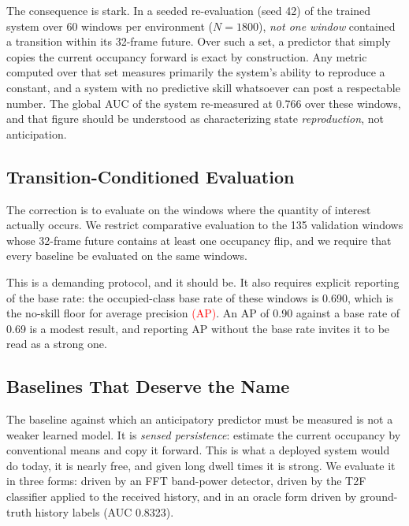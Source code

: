 \documentclass[lettersize,journal]{IEEEtran}
\newcommand{\red}[1]{\textcolor{red}{#1}}
\begin{document}
The consequence is stark. In a seeded re-evaluation (seed 42) of the
trained system over 60 windows per environment ($N = 1800$), \emph{not
one window} contained a transition within its 32-frame future. Over such
a set, a predictor that simply copies the current occupancy forward is
exact by construction. Any metric computed over that set measures
primarily the system's ability to reproduce a constant, and a system
with no predictive skill whatsoever can post a respectable number. The
global AUC of the system re-measured at 0.766 over these windows, and
that figure should be understood as characterizing state
\emph{reproduction}, not anticipation.

\subsection{\textbf{Transition-Conditioned Evaluation}}
The correction is to evaluate on the windows where the quantity of
interest actually occurs. We restrict comparative evaluation to the 135
validation windows whose 32-frame future contains at least one occupancy
flip, and we require that every baseline be evaluated on the same
windows.

This is a demanding protocol, and it should be. It also requires
explicit reporting of the base rate: the occupied-class base rate of
these windows is 0.690, which is the no-skill floor for average
precision \red{(AP)}. An AP of 0.90 against a base rate of 0.69 is a modest result,
and reporting AP without the base rate invites it to be read as a strong
one.

\subsection{\textbf{Baselines That Deserve the Name}}
The baseline against which an anticipatory predictor must be measured is
not a weaker learned model. It is \emph{sensed persistence}: estimate the
current occupancy by conventional means and copy it forward. This is what
a deployed system would do today, it is nearly free, and given long dwell
times it is strong. We evaluate it in three forms: driven by an FFT
band-power detector, driven by the T2F classifier applied to the received
history, and in an oracle form driven by ground-truth history labels
(AUC 0.8323).
\end{document}

